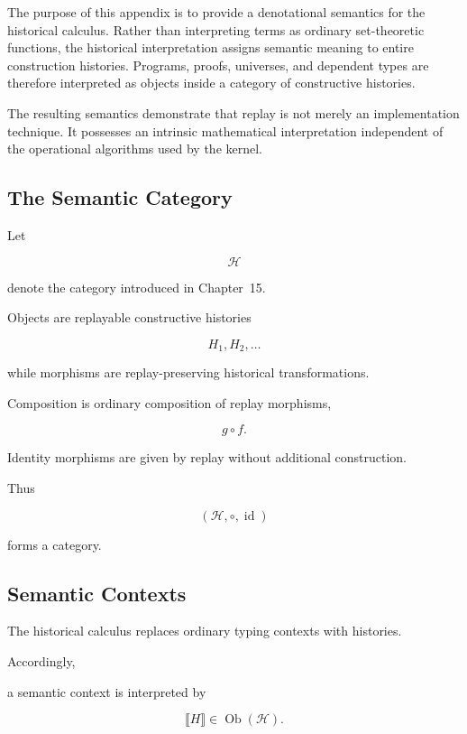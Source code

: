 \documentclass[12pt,oneside]{article}
\theoremstyle{definition}
\theoremstyle{remark}
\begin{document}
The purpose of this appendix is to provide a denotational semantics for the
historical calculus. Rather than interpreting terms as ordinary set-theoretic
functions, the historical interpretation assigns semantic meaning to entire
construction histories. Programs, proofs, universes, and dependent types are
therefore interpreted as objects inside a category of constructive histories.

The resulting semantics demonstrate that replay is not merely an implementation
technique. It possesses an intrinsic mathematical interpretation independent of
the operational algorithms used by the kernel.


\subsection{The Semantic Category}

Let

\[
\mathcal H
\]

denote the category introduced in Chapter~15.

Objects are replayable constructive histories

\[
H_1,H_2,\ldots
\]

while morphisms are replay-preserving historical transformations.

Composition is ordinary composition of replay morphisms,

\[
g\circ f.
\]

Identity morphisms are given by replay without additional construction.

Thus

\[
(\mathcal H,\circ,\operatorname{id})
\]

forms a category.


\subsection{Semantic Contexts}

The historical calculus replaces ordinary typing contexts with histories.

Accordingly,

a semantic context is interpreted by

\[
\llbracket H\rrbracket
\in
\operatorname{Ob}(\mathcal H).
\]
\end{document}
